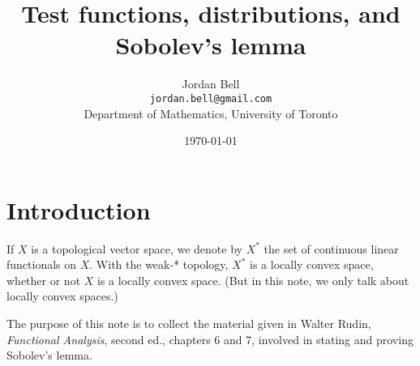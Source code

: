 \documentclass{article}
\theoremstyle{definition}
\begin{document}
\title{Test functions, distributions, and Sobolev's lemma}
\author{Jordan Bell\\ \texttt{jordan.bell@gmail.com}\\Department of Mathematics, University of Toronto}
\date{\today}

\maketitle

\section{Introduction}
If $X$ is a topological vector space, we denote by $X^*$ the set of continuous linear functionals on $X$. With the weak-* topology, $X^*$ is a locally convex space, whether or not
$X$ is a locally convex space. (But in this note, we only talk about locally convex spaces.)

The purpose of this note is to collect the material given in Walter Rudin, {\em Functional Analysis}, second ed., chapters 6 and 7,
 involved in stating and proving Sobolev's lemma.
 
\end{document}
